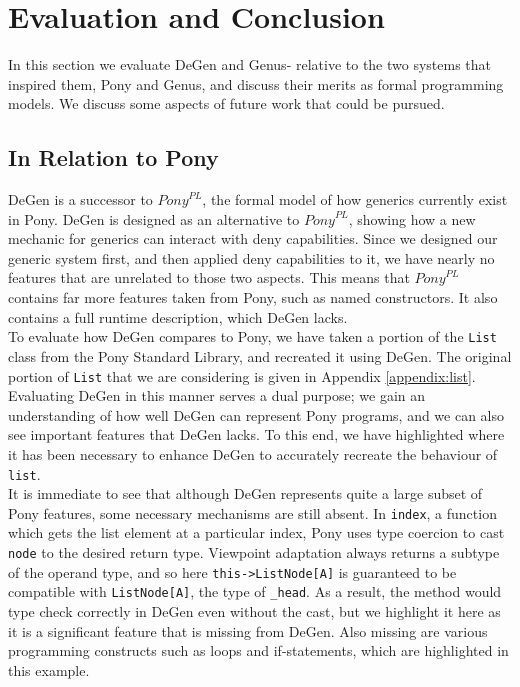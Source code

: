 \chapter{Evaluation and Conclusion}

In this section we evaluate DeGen and Genus- relative to the two systems that inspired them, Pony and Genus, and discuss their merits as formal programming models. We discuss some aspects of future work that could be pursued.

\section{In Relation to Pony}

DeGen is a successor to $\textit{Pony}^{PL}$, the formal model of how generics currently exist in Pony. DeGen is designed as an alternative to $\textit{Pony}^{PL}$, showing how a new mechanic for generics can interact with deny capabilities. Since we designed our generic system first, and then applied deny capabilities to it, we have nearly no features that are unrelated to those two aspects. This means that $\textit{Pony}^{PL}$ contains far more features taken from Pony, such as named constructors. It also contains a full runtime description, which DeGen lacks. \\

To evaluate how DeGen compares to Pony, we have taken a portion of the \texttt{List} class from the Pony Standard Library, and recreated it using DeGen. The original portion of \texttt{List} that we are considering is given in Appendix \ref{appendix:list}. Evaluating DeGen in this manner serves a dual purpose; we gain an understanding of how well DeGen can represent Pony programs, and we can also see important features that DeGen lacks. To this end, we have highlighted where it has been necessary to enhance DeGen to accurately recreate the behaviour of \texttt{list}. \\

It is immediate to see that although DeGen represents quite a large subset of Pony features, some necessary mechanisms are still absent. In \texttt{index}, a function which gets the list element at a particular index, Pony uses type coercion to cast \texttt{node} to the desired return type. Viewpoint adaptation always returns a subtype of the operand type, and so here \texttt{this->ListNode[A]} is guaranteed to be compatible with \texttt{ListNode[A]}, the type of \texttt{\_head}. As a result, the method would type check correctly in DeGen even without the cast, but we highlight it here as it is a significant feature that is missing from DeGen. Also missing are various programming constructs such as loops and if-statements, which are highlighted in this example. \\

